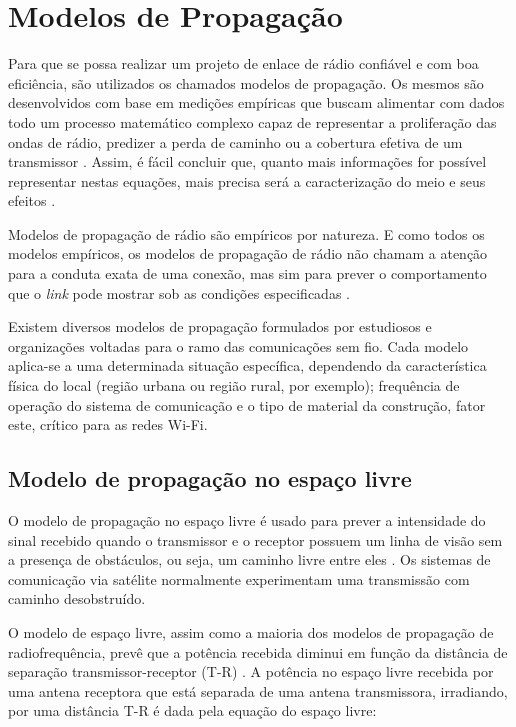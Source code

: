 \section{Modelos de Propagação}
\label{sec:modelos-propagacao}

Para que se possa realizar um projeto de enlace de rádio confiável e com boa eficiência, são utilizados os chamados modelos de propagação. Os mesmos são desenvolvidos com base em medições empíricas que buscam alimentar com dados todo um processo matemático complexo capaz de representar a proliferação das ondas de rádio, predizer a perda de caminho ou a cobertura efetiva de um transmissor \cite{akpaida2018,najnudel2004}. Assim, é fácil concluir que, quanto mais informações for possível representar nestas equações, mais precisa será a caracterização do meio e seus efeitos \cite{akpaida2018}.

Modelos de propagação de rádio são empíricos por natureza. E como todos os modelos empíricos, os modelos de propagação de rádio não chamam a atenção para a conduta exata de uma conexão, mas sim para prever o comportamento que o \textit{link} pode mostrar sob as condições especificadas \cite{akpaida2018}.

Existem diversos modelos de propagação formulados por estudiosos e organizações voltadas para o ramo das comunicações sem fio. Cada modelo aplica-se a uma determinada situação específica, dependendo da característica física do local (região urbana ou região rural, por exemplo); frequência de operação do sistema de comunicação e o tipo de material da construção, fator este, crítico para as redes Wi-Fi.

\subsection{Modelo de propagação no espaço livre}
\label{sub:espaco-livre}

O modelo de propagação no espaço livre é usado para prever a intensidade do sinal recebido quando o transmissor e o receptor possuem um linha de visão sem a presença de obstáculos, ou seja, um caminho livre entre eles \cite{rappaport2009}. Os sistemas de comunicação via satélite normalmente experimentam uma transmissão com caminho desobstruído.

O modelo de espaço livre, assim como a maioria dos modelos de propagação de radiofrequência, prevê que a potência recebida diminui em função da distância de separação transmissor-receptor (T-R) \cite{rappaport2009}. A potência no espaço livre recebida por uma antena receptora que está separada de uma antena transmissora, irradiando, por uma distância T-R é dada pela equação do espaço livre:

